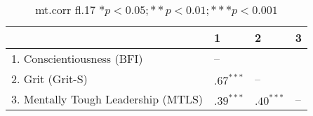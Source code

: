 \begin{table}[ht]
\centering
\begin{tabular}{llll}
  \hline
 & 1 & 2 & 3 \\ 
  \hline
1. Conscientiousness (BFI) & -- &  &  \\ 
  2. Grit (Grit-S) & $.67^{***}$ & -- &  \\ 
  3. Mentally Tough Leadership (MTLS) & $.39^{***}$ & $.40^{***}$ & -- \\ 
   \hline
\end{tabular}
\caption{mt.corr fl.17 $* p < 0.05; ** p < 0.01; *** p < 0.001$} 
\label{freq_corr.mt.corr.fl.17}
\end{table}
